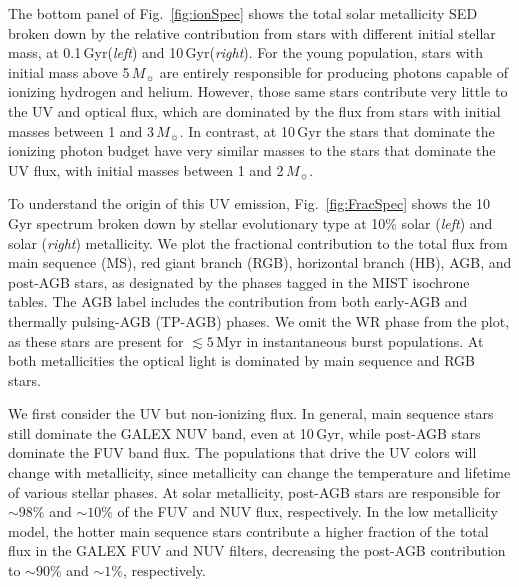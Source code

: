 \documentclass[preprint2]{aastex62}
\newcommand\Msun{\ensuremath{\,M_{\sun}}\xspace}
\newcommand{\Myr}{$\,$Myr\xspace}
\newcommand{\Gyr}{$\,$Gyr\xspace}
\begin{document}
The bottom panel of Fig.~\ref{fig:ionSpec} shows the total solar metallicity SED broken down by the relative contribution from stars with different initial stellar mass, at 0.1\Gyr (\emph{left}) and 10\Gyr (\emph{right}). For the young population, stars with initial mass above 5\Msun are entirely responsible for producing photons capable of ionizing hydrogen and helium. However, those same stars contribute very little to the UV and optical flux, which are dominated by the flux from stars with initial masses between 1 and 3\Msun. In contrast, at 10\Gyr the stars that dominate the ionizing photon budget have very similar masses to the stars that dominate the UV flux, with initial masses between 1 and 2\Msun.

To understand the origin of this UV emission, Fig.~\ref{fig:FracSpec} shows the 10\Gyr spectrum broken down by stellar evolutionary type at 10\% solar (\emph{left}) and solar (\emph{right}) metallicity. We plot the fractional contribution to the total flux from main sequence (MS), red giant branch (RGB), horizontal branch (HB), AGB, and post-AGB stars, as designated by the phases tagged in the MIST isochrone tables. The AGB label includes the contribution from both early-AGB and thermally pulsing-AGB (TP-AGB) phases. We omit the WR phase from the plot, as these stars are present for $\lesssim5$\Myr in instantaneous burst populations. At both metallicities the optical light is dominated by main sequence and RGB stars. 

We first consider the UV but non-ionizing flux. In general, main sequence stars still dominate the GALEX NUV band, even at 10\Gyr, while post-AGB stars dominate the FUV band flux. The populations that drive the UV colors will change with metallicity, since metallicity can change the temperature and lifetime of various stellar phases. At solar metallicity, post-AGB stars are responsible for $\sim98\%$ and $\sim10\%$ of the FUV and NUV flux, respectively. In the low metallicity model, the hotter main sequence stars contribute a higher fraction of the total flux in the GALEX FUV and NUV filters, decreasing the post-AGB contribution to $\sim90\%$ and $\sim1\%$, respectively. %
\end{document}
